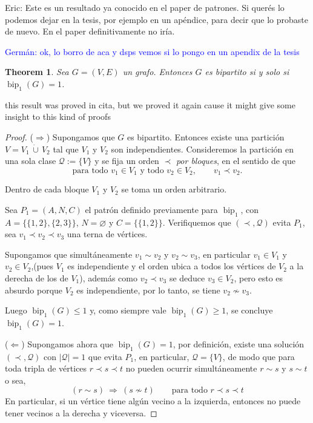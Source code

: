 \documentclass[12pt]{article}
\theoremstyle{plain}
\newtheorem{theorem}{Theorem}[section]
\theoremstyle{definition}
\theoremstyle{remark}
\theoremstyle{definition}
\newcommand{\eric}[1]{%
  \textcolor{green!50!black}{Eric: #1}%
}
\newcommand{\german}[1]{%
  \textcolor{blue}{Germán: #1}%
}
\newcommand{\segone}{\operatorname{bip}_{1}}
\begin{document}
\eric{Este es un resultado ya conocido en el paper de patrones. Si querés lo podemos dejar en la tesis, por ejemplo en un apéndice, para decir que lo probaste de nuevo. En el paper definitivamente no iría.}

\german{ok, lo borro de aca y dsps vemos si lo pongo en un apendix de la tesis}

\begin{theorem}\label{thm:seg1-bip}
Sea \(G=(V,E)\) un grafo. Entonces \(G\) es bipartito si y solo si \(\segone(G)=1\).
\end{theorem}

this result was proved in cita, but we proved it again cause it might give some insight 
to this kind of proofs


\begin{proof}
\noindent(\(\Rightarrow\)) Supongamos que \(G\) es bipartito. Entonces existe una partición
\(V=V_1\,\dot\cup\,V_2\) tal que \(V_1\) y \(V_2\) son independientes.
Consideremos la partición en una sola clase \(\mathcal{Q}:=\{V\}\) y se fija un orden \(\prec\) \emph{por bloques}, en el sentido de que
\[
\text{para todo } v_1\in V_1 \text{ y todo } v_2\in V_2,\qquad v_1\prec v_2.
\]

Dentro de cada bloque \(V_1\) y \(V_2\) se toma un orden arbitrario.

Sea \(P_1=(A,N,C)\) el patrón definido previamente para \(\segone\), con
\(A=\{\{1,2\},\{2,3\}\}\), \(N=\varnothing\) y \(C=\{\{1,2\}\}\).
Verifiquemos que \((\prec,\mathcal{Q})\) evita \(P_1\),
sea \(v_1\prec v_2\prec v_3\) una terna de vértices.


Supongamos que simultáneamente \(v_1\sim v_2\) y \(v_2\sim v_3\), en particular \(v_1\in V_1\) y \(v_2\in V_2\),(pues \(V_1\) es independiente y el orden ubica a todos los vértices de \(V_2\) a la derecha de los de \(V_1\)),
además como \(v_2\prec v_3\) se deduce \(v_3\in V_2\), pero esto es absurdo porque \(V_2\) es independiente, por lo tanto,
se tiene \(v_2\not\sim v_3\).

Luego \(\segone(G)\le 1\) y, como siempre vale \(\segone(G)\ge 1\), se concluye \(\segone(G)=1\).




\medskip
\noindent(\(\Leftarrow\)) Supongamos ahora que \(\segone(G)=1\),
por definición, existe una solución \((\prec,\mathcal{Q})\) con \(|\mathcal{Q}|=1\) que evita \(P_1\),
en particular, \(\mathcal{Q}=\{V\}\), de modo que para toda tripla de vértices
\(r\prec s\prec t\) no pueden ocurrir simultáneamente
\(r\sim s\) y \(s\sim t\) o sea,
\[
(r\sim s)\ \Rightarrow\ (s\not\sim t)
\qquad\text{para todo } r\prec s\prec t
\]
En particular, si un vértice tiene algún vecino a la izquierda, entonces no puede tener vecinos a la derecha 
y viceversa.



\end{proof}
\end{document}
